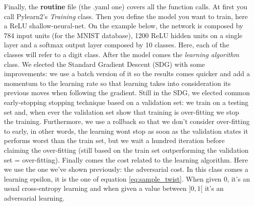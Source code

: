 		Finally, the \textbf{routine} file (the .yaml one) covers all the function calls. At first you call Pylearn2's \textit{Training} class. Then you define the model you want to train, here a ReLU shallow-neural-net. On the example below, the network is composed by 784 input units (for the MNIST database), 1200 ReLU hidden units on a single layer and a softmax output layer composed by 10 classes. Here, each of the classes will refer to a digit class. After the model comes the \textit{learning algorithm} class. We elected the Standard Gradient Descent (SDG) with some improvements: we use a batch version of it so the results comes quicker and add a momentum to the learning rate so that learning takes into consideration its previous moves when following the gradient. Still in the SDG, we elected common early-stopping stopping technique based on a validation set: we train on a testing set and, when ever the validation set show that training is over-fitting we stop the training. Furthermore, we use a rollback so that we don't consider over-fitting to early, in other words, the learning wont stop as soon as the validation states it performs worst than the train set, but we wait a hundred iteration before claiming the over-fitting (still based on the train set outperforming the validation set = over-fitting). Finally comes the cost related to the learning algorithm. Here we use the one we've shown previously: the adversarial cost. In this class comes a learning epsilon, it is the one of equation \ref{eq:sample_twist}. When given $0$, it's an usual cross-entropy learning and when given a value between $]0,1[$ it's an adversarial learning. 


